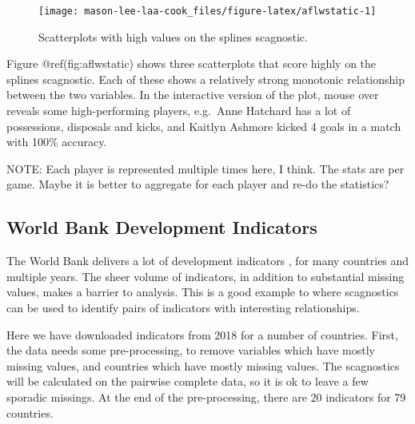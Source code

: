 \begin{Schunk}
\begin{figure}
\texttt{[image: mason-lee-laa-cook\_files/figure-latex/aflwstatic-1]} \caption[Scatterplots with high values on the splines scagnostic]{Scatterplots with high values on the splines scagnostic.}\label{fig:aflwstatic}
\end{figure}
\end{Schunk}

Figure @ref(fig:aflwstatic) shows three scatterplots that score highly
on the splines scagnostic. Each of these shows a relatively strong
monotonic relationship between the two variables. In the interactive
version of the plot, mouse over reveals some high-performing players,
e.g.~Anne Hatchard has a lot of possessions, disposals and kicks, and
Kaitlyn Ashmore kicked 4 goals in a match with 100\% accuracy.

NOTE: Each player is represented multiple times here, I think. The stats
are per game. Maybe it is better to aggregate for each player and re-do
the statistics?

\hypertarget{world-bank-development-indicators}{%
\subsection{World Bank Development
Indicators}\label{world-bank-development-indicators}}

The World Bank delivers a lot of development indicators \citep{WBI}, for
many countries and multiple years. The sheer volume of indicators, in
addition to substantial missing values, makes a barrier to analysis.
This is a good example to where scagnostics can be used to identify
pairs of indicators with interesting relationships.

Here we have downloaded indicators from 2018 for a number of countries.
First, the data needs some pre-processing, to remove variables which
have mostly missing values, and countries which have mostly missing
values. The scagnostics will be calculated on the pairwise complete
data, so it is ok to leave a few sporadic missings. At the end of the
pre-processing, there are 20 indicators for 79 countries.

